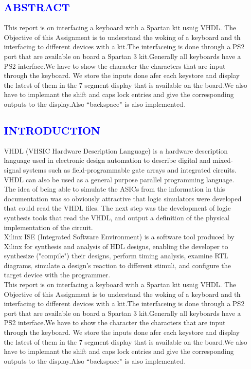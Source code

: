 \documentclass[a4paper,12pt]{report}
\begin{document}
\begin{center}
\chapter{\textcolor{blue}{ABSTRACT}}
\end{center}
\noindent This report is on interfacing a keyboard with a Spartan kit usnig VHDL.
The Objective of this Assignment is to understand the woking of a keyboard and th
interfacing to different devices with a kit.The interfaceing is done through a PS2 
port that are available on board a Spartan 3 kit.Generally all keyboards have a PS2
interface.We have to show the character the characters that are input through the keyboard.
We store the inputs done afer each keystore and display the latest of them in the 
7 segment display that is available on the board.We also have to implemant the shift and caps lock
entries and give the corresponding outputs to the display.Also ``backspace'' is also implemented.
\begin{center}
\chapter{\textcolor{blue}{INTRODUCTION}}
\end{center}
\noindent VHDL (VHSIC Hardware Description Language) is a hardware description language used in 
electronic design automation to describe digital and mixed-signal systems such as field-programmable
gate arrays and integrated circuits. VHDL can also be used as a general purpose parallel programming language.\\

  The idea of being able to simulate the ASICs from the information in this documentation was so obviously attractive 
that logic simulators were developed that could read the VHDL files. The next step was the development of logic 
synthesis tools that read the VHDL, and output a definition of the physical implementation of the circuit.\\

Xilinx ISE (Integrated Software Environment) is a software tool produced by Xilinx for synthesis and 
analysis of HDL designs, enabling the developer to synthesize ("compile") their designs, perform timing
analysis, examine RTL diagrams, simulate a design's reaction to different stimuli, and configure the target
device with the programmer.\\

This report is on interfacing a keyboard with a Spartan kit usnig VHDL.
The Objective of this Assignment is to understand the woking of a keyboard and th
interfacing to different devices with a kit.The interfaceing is done through a PS2 
port that are available on board a Spartan 3 kit.Generally all keyboards have a PS2
interface.We have to show the character the characters that are input through the keyboard.
We store the inputs done afer each keystore and display the latest of them in the 
7 segment display that is available on the board.We also have to implemant the shift and caps lock
entries and give the corresponding outputs to the display.Also ``backspace'' is also implemented.
 
\end{document}
